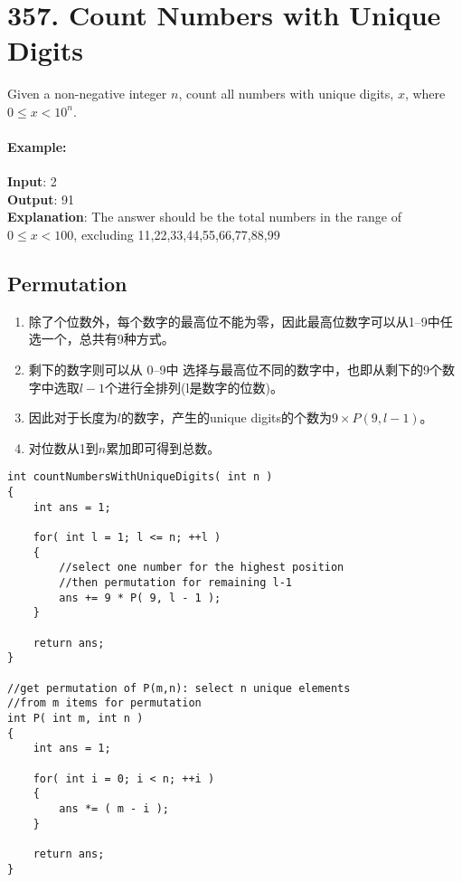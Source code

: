 \section{357. Count Numbers with Unique Digits}
Given a non-negative integer $ n $, count all numbers with unique digits, $ x $, where $0 \leq x < 10^n$.

\paragraph{Example:}

\begin{flushleft}
\textbf{Input}: 2
\\
\textbf{Output}: 91 
\\
\textbf{Explanation}: The answer should be the total numbers in the range of $0 \leq x < 100$, excluding 11,22,33,44,55,66,77,88,99
\end{flushleft}

\subsection{Permutation}
\begin{enumerate}
\item 除了个位数外，每个数字的最高位不能为零，因此最高位数字可以从1--9中任选一个，总共有9种方式。
\item 剩下的数字则可以从 0--9中 选择与最高位不同的数字中，也即从剩下的9个数字中选取$l-1$个进行全排列(l是数字的位数)。
\item 因此对于长度为$l$的数字，产生的unique digits的个数为$9\times P(9, l-1)$。
\item 对位数从1到$ n $累加即可得到总数。
\end{enumerate}

\setcounter{lstlisting}{0}
\begin{lstlisting}[style=customc, caption={Permutation}]
int countNumbersWithUniqueDigits( int n )
{
    int ans = 1;

    for( int l = 1; l <= n; ++l )
    {
        //select one number for the highest position
        //then permutation for remaining l-1
        ans += 9 * P( 9, l - 1 );
    }

    return ans;
}

//get permutation of P(m,n): select n unique elements
//from m items for permutation
int P( int m, int n )
{
    int ans = 1;

    for( int i = 0; i < n; ++i )
    {
        ans *= ( m - i );
    }

    return ans;
}
\end{lstlisting}